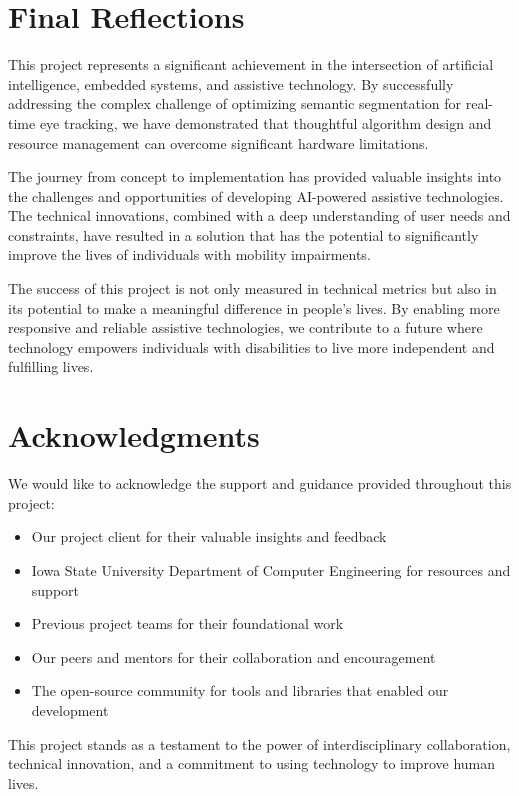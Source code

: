 \section{Final Reflections}\label{sec:final-reflections}

This project represents a significant achievement in the intersection of artificial intelligence, embedded systems, and assistive technology. By successfully addressing the complex challenge of optimizing semantic segmentation for real-time eye tracking, we have demonstrated that thoughtful algorithm design and resource management can overcome significant hardware limitations.

The journey from concept to implementation has provided valuable insights into the challenges and opportunities of developing AI-powered assistive technologies. The technical innovations, combined with a deep understanding of user needs and constraints, have resulted in a solution that has the potential to significantly improve the lives of individuals with mobility impairments.

The success of this project is not only measured in technical metrics but also in its potential to make a meaningful difference in people's lives. By enabling more responsive and reliable assistive technologies, we contribute to a future where technology empowers individuals with disabilities to live more independent and fulfilling lives.

\section{Acknowledgments}\label{sec:acknowledgments}

We would like to acknowledge the support and guidance provided throughout this project:

\begin{itemize}
\item Our project client for their valuable insights and feedback
\item Iowa State University Department of Computer Engineering for resources and support
\item Previous project teams for their foundational work
\item Our peers and mentors for their collaboration and encouragement
\item The open-source community for tools and libraries that enabled our development
\end{itemize}

This project stands as a testament to the power of interdisciplinary collaboration, technical innovation, and a commitment to using technology to improve human lives.
